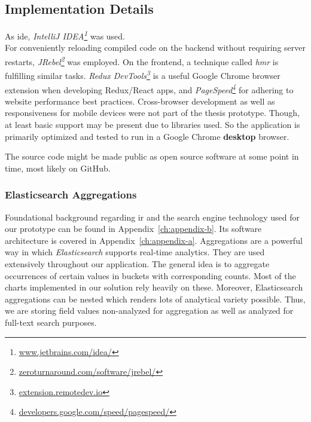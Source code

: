 \subsection{Implementation Details}

As \gls{ide}, \emph{IntelliJ IDEA\footnote{\textcolor{blue}{\href{https://www.jetbrains.com/idea/}{www.jetbrains.com/idea/}}}} was used. \\
For conveniently reloading compiled code on the backend without requiring server restarts, \emph{JRebel\footnote{\textcolor{blue}{\href{https://zeroturnaround.com/software/jrebel/}{zeroturnaround.com/software/jrebel/}}}} was employed.
On the frontend, a technique called \emph{\gls{hmr}} is fulfilling similar tasks.
\emph{Redux DevTools\footnote{\textcolor{blue}{\href{http://extension.remotedev.io/}{extension.remotedev.io}}}} is a useful Google Chrome browser extension when developing Redux/React apps, and \emph{PageSpeed\footnote{\textcolor{blue}{\href{https://developers.google.com/speed/pagespeed/}{developers.google.com/speed/pagespeed/}}}} for adhering to website performance best practices.
Cross-browser development as well as responsiveness for mobile devices were not part of the thesis prototype. Though, at least basic support may be present due to libraries used.
So the application is primarily optimized and tested to run in a Google Chrome \textbf{desktop} browser.

The source code might be made public as open source software at some point in time, most likely on GitHub.


\subsubsection{Elasticsearch Aggregations}

Foundational background regarding \gls{ir} and the search engine technology used for our prototype can be found in Appendix~\ref{ch:appendix-b}.
Its software architecture is covered in Appendix~\ref{ch:appendix-a}.
Aggregations are a powerful way in which \emph{Elasticsearch} supports real-time analytics.
They are used extensively throughout our application.
The general idea is to aggregate occurrences of certain values in buckets with corresponding counts.
Most of the charts implemented in our solution rely heavily on these. Moreover, Elasticsearch aggregations can be nested which renders lots of analytical variety possible.
Thus, we are storing field values non-analyzed for aggregation as well as analyzed for full-text search purposes.

